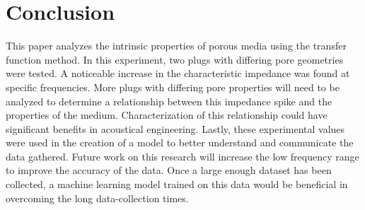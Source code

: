 \section{Conclusion}
This paper analyzes the intrinsic properties of porous media using the transfer function method. 
In this experiment, two plugs with differing pore geometries were tested. 
A noticeable increase in the characteristic impedance was found at specific frequencies. 
More plugs with differing pore properties will need to be analyzed to determine a relationship between this impedance spike and the properties of the medium. 
Characterization of this relationship could have significant benefits in acoustical engineering. 
Lastly, these experimental values were used in the creation of a model to better understand and communicate the data gathered. 
Future work on this research will increase the low frequency range to improve the accuracy of the data. 
Once a large enough dataset has been collected, a machine learning model trained on this data would be beneficial in overcoming the long data-collection times.
